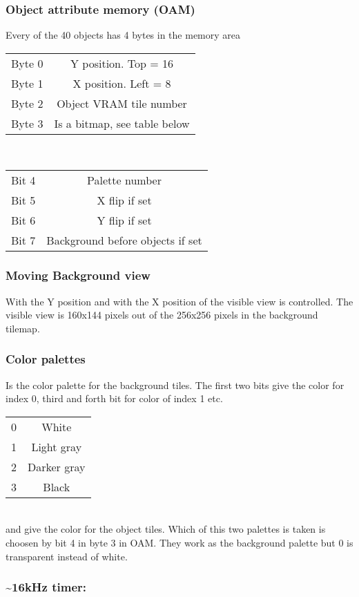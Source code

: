 \documentclass[a5paper,9pt]{extarticle}
\begin{document}
\begin{multicols}{2}
\subsubsection*{Object attribute memory (OAM)}
   Every of the 40 objects has 4 bytes in the memory area  \\
\begin{tabular}{ c c }
    Byte 0 & Y position. Top = 16 \\  
    Byte 1 & X position. Left = 8 \\
    Byte 2 & Object VRAM tile number  \\
    Byte 3 & Is a bitmap, see table below \\
   \end{tabular}
\\
\begin{tabular}{ c c }
    Bit 4 & Palette number \\
    Bit 5 & X flip if set \\
    Bit 6 & Y flip if set \\
    Bit 7 & Background before objects if set
   \end{tabular}
\subsubsection*{Moving Background view}
With  the Y position and with  the X position of the visible view is controlled. The visible view is 160x144 pixels out of the 256x256 pixels in the background tilemap.
\subsubsection*{Color palettes}
 Is the color palette for the background tiles. The first two bits give the color for index 0, third and forth bit for color of index 1 etc.
\\
\begin{tabular}{ c c }
    0 & White \\
    1 & Light gray \\
    2 & Darker gray \\
    3 & Black
   \end{tabular}
   \\
 and  give the color for the object tiles. Which of this two palettes is taken is choosen by bit 4 in byte 3 in OAM. They work as the background palette but 0 is transparent instead of white.
\subsubsection*{\textasciitilde 16kHz timer:  }

\end{multicols}
\end{document}

